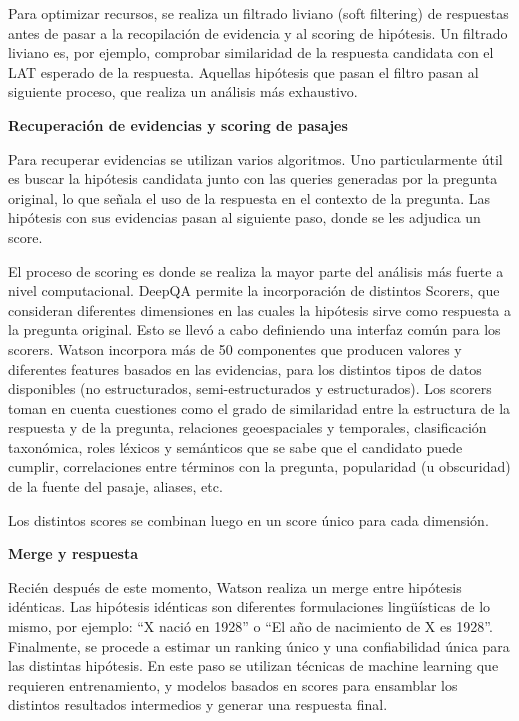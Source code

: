 Para optimizar recursos, se realiza un filtrado liviano (soft filtering) de respuestas
antes de pasar a la recopilación de evidencia y al scoring de
hipótesis. Un filtrado liviano es, por ejemplo, comprobar similaridad
de la respuesta candidata con el LAT esperado de la respuesta. Aquellas
hipótesis que pasan el filtro pasan al siguiente proceso, que realiza
un análisis más exhaustivo. \newline

\textbf{Recuperación de evidencias y scoring de pasajes}\newline

Para recuperar evidencias se utilizan varios algoritmos. Uno
particularmente útil es buscar la hipótesis candidata junto con las
queries generadas por la pregunta original, lo que señala el uso de
la respuesta en el contexto de la pregunta.  Las hipótesis con sus
evidencias pasan al siguiente paso, donde se les adjudica un score.

El proceso de scoring es donde se realiza la mayor parte del análisis
más fuerte a nivel computacional. DeepQA permite la incorporación
de distintos Scorers, que consideran diferentes dimensiones en las
cuales la hipótesis sirve como respuesta a la pregunta original. Esto
se llevó a cabo definiendo una interfaz común para los scorers.
Watson incorpora más de 50 componentes que producen valores y
diferentes features basados en las evidencias, para los distintos tipos
de datos disponibles (no estructurados, semi-estructurados y
estructurados). Los scorers toman en cuenta cuestiones como el grado de
similaridad entre la estructura de la respuesta y de la pregunta,
relaciones geoespaciales y temporales, clasificación taxonómica,
roles léxicos y semánticos que se sabe que el candidato puede
cumplir, correlaciones entre términos con la pregunta, popularidad (u
obscuridad) de la fuente del pasaje, aliases, etc.

Los distintos scores se combinan luego en un score único para cada
dimensión. \newline

\textbf{Merge y respuesta}\newline

Recién después de este momento, Watson realiza un merge entre
hipótesis idénticas. Las hipótesis idénticas son diferentes
formulaciones lingüísticas de lo mismo, por ejemplo:
{\textquotedblleft}X nació en 1928{\textquotedblright} o
{\textquotedblleft}El año de nacimiento de X es
1928{\textquotedblright}. Finalmente, se procede a estimar un ranking
único y una confiabilidad única para las distintas hipótesis. En
este paso se utilizan técnicas de machine learning que requieren
entrenamiento, y modelos basados en scores para ensamblar los distintos
resultados intermedios y generar una respuesta final.
